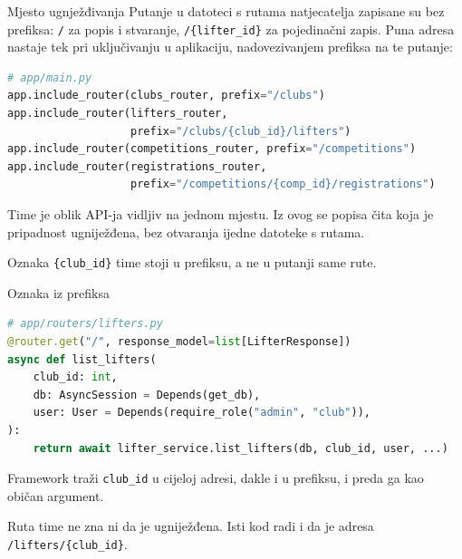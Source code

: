 \begin{frame}[fragile]{Mjesto ugnježđivanja}
Putanje u datoteci s rutama natjecatelja zapisane su bez prefiksa: \texttt{/} za popis i stvaranje, \texttt{/\{lifter\_id\}} za pojedinačni zapis. Puna adresa nastaje tek pri uključivanju u aplikaciju, nadovezivanjem prefiksa na te putanje:

\begin{lstlisting}[language=python]
# app/main.py
app.include_router(clubs_router, prefix="/clubs")
app.include_router(lifters_router,
                   prefix="/clubs/{club_id}/lifters")
app.include_router(competitions_router, prefix="/competitions")
app.include_router(registrations_router,
                   prefix="/competitions/{comp_id}/registrations")
\end{lstlisting}

\vspace{0.4em}
Time je oblik API-ja vidljiv na jednom mjestu. Iz ovog se popisa čita koja je pripadnost ugniježđena, bez otvaranja ijedne datoteke s rutama.

\vspace{0.9em}
Oznaka \texttt{\{club\_id\}} time stoji u prefiksu, a ne u putanji same rute.
\end{frame}

\begin{frame}[fragile]{Oznaka iz prefiksa}
\begin{lstlisting}[language=python]
# app/routers/lifters.py
@router.get("/", response_model=list[LifterResponse])
async def list_lifters(
    club_id: int,
    db: AsyncSession = Depends(get_db),
    user: User = Depends(require_role("admin", "club")),
):
    return await lifter_service.list_lifters(db, club_id, user, ...)
\end{lstlisting}

\vspace{0.4em}
Framework traži \texttt{club\_id} u cijeloj adresi, dakle i u prefiksu, i preda ga kao običan argument.

\vspace{0.9em}
Ruta time ne zna ni da je ugniježđena. Isti kod radi i da je adresa \texttt{/lifters/\{club\_id\}}.
\end{frame}


